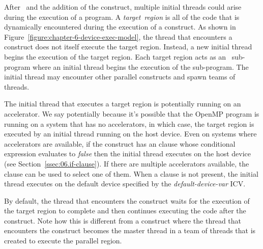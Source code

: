 \begin{figure*}[!tb]
\centering
{}
\caption{ \textbf{The heterogeneous programming model supported by OpenMP} -- \small
        Program execution begins on the host device.  When a host device
        thread encounters a \texttt{target} construct, a new initial thread 
        executes the target region.  When the initial thread encounters
        a \texttt{parallel} construct it becomes the master of a
        teams of threads.
        }
\label{figure:chapter-6-device-exec-model}
\end{figure*}

After \OMPfourzero\ and the addition of the  construct, multiple
initial threads could arise during the execution of a program.  A
\emph{target}~\emph{region} is all of the code that is dynamically encountered
during the execution of a  construct.  As shown in
Figure~\ref{figure:chapter-6-device-exec-model}, the thread that encounters a
 construct does not itself execute the target region.  Instead, a
new initial thread begins the execution of the target region.  Each
target region acts as an \OMP\ sub-program where an initial thread begins the
execution of the sub-program.  The initial thread may encounter
other parallel constructs and spawn teams of threads. 

The initial thread that executes a target region is potentially running on an
accelerator.  We say potentially because it's possible that the OpenMP
program is running on a system that has no accelerators, in which case, the
target region is executed by an initial thread running on the host device.
Even on systems where accelerators are available, if the 
construct has an  clause whose conditional expression evaluates to
\emph{false} then the initial thread executes on the host device (see
Section~\ref{ssec:06.if-clause}).  If there are multiple accelerators
available, the  clause %
can be used to select one of them.  When a  clause is not present,
the initial thread executes on the default device specified by the
\emph{default-device-var} ICV.

By default, the thread that encounters the  construct waits for
the execution of the target region to complete and then continues executing the
code after the  construct.  Note how this is different from a
 construct where the thread that encounters the construct
becomes the master thread in a team of threads that is created to execute the
parallel region.  

